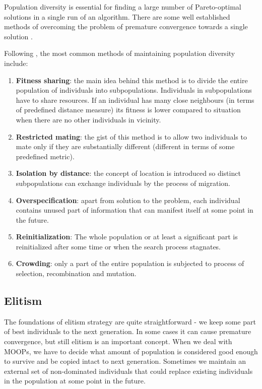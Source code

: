 Population diversity is essential for finding a large number of Pareto-optimal solutions in a single run of an algorithm.
There are some well established methods of overcoming the problem of premature convergence towards a single solution \cite{Phd}. 

Following \cite{Phd}, the most common methods of maintaining population diversity include:

\begin{enumerate}

  \item \textbf{Fitness sharing}:
	the main idea behind this method is to divide the entire population of individuals into subpopulations.
	Individuals in subpopulations have to share resources.
	If an individual has many close neighbours (in terms of predefined distance measure) its fitness is lower compared to situation when there are
	no other individuals in vicinity. 
	
  \item \textbf{Restricted mating}:
	the gist of this method is to allow two individuals to mate only if they are substantially different (different in terms of some predefined metric).
  \item \textbf{Isolation by distance}:
	the concept of location is introduced so distinct subpopulations can exchange individuals by the process of migration. 
  \item \textbf{Overspecification}:
	apart from solution to the problem, each individual contains unused part of information that can manifest itself at some point in the future.
  \item \textbf{Reinitialization}:
	The whole population or at least a significant part is reinitialized after some time or when the search process stagnates.
  \item \textbf{Crowding}:
	only a part of the entire population is subjected to process of selection, recombination and mutation. 
\end{enumerate}

\subsection{Elitism}

The foundations of elitism strategy are quite straightforward - we keep some part of best individuals to the next generation.
In some cases it can cause premature convergence, but still elitism is an important concept.
When we deal with MOOPs, we have to decide what amount of population is considered good enough to survive and be copied intact to next generation.
Sometimes we maintain an external set of non-dominated individuals that could replace existing individuals in the population at some point in the future.
   
